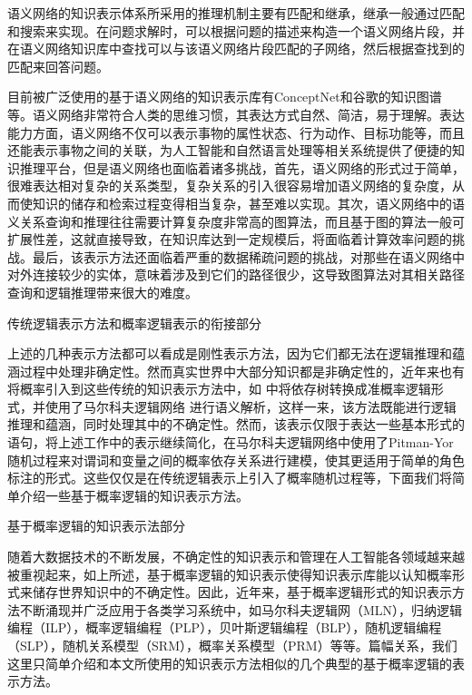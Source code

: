 语义网络的知识表示体系所采用的推理机制主要有匹配和继承，继承一般通过匹配和搜索来实现。在问题求解时，可以根据问题的描述来构造一个语义网络片段，并在语义网络知识库中查找可以与该语义网络片段匹配的子网络，然后根据查找到的匹配来回答问题。

目前被广泛使用的基于语义网络的知识表示库有ConceptNet\cite{Liu2004}和谷歌的知识图谱等。语义网络非常符合人类的思维习惯，其表达方式自然、简洁，易于理解。表达能力方面，语义网络不仅可以表示事物的属性状态、行为动作、目标功能等，而且还能表示事物之间的关联，为人工智能和自然语言处理等相关系统提供了便捷的知识推理平台，但是语义网络也面临着诸多挑战，首先，语义网络的形式过于简单，很难表达相对复杂的关系类型，复杂关系的引入很容易增加语义网络的复杂度，从而使知识的储存和检索过程变得相当复杂，甚至难以实现。其次，语义网络中的语义关系查询和推理往往需要计算复杂度非常高的图算法，而且基于图的算法一般可扩展性差，这就直接导致，在知识库达到一定规模后，将面临着计算效率问题的挑战。最后，该表示方法还面临着严重的数据稀疏问题的挑战，对那些在语义网络中对外连接较少的实体，意味着涉及到它们的路径很少，这导致图算法对其相关路径查询和逻辑推理带来很大的难度。



传统逻辑表示方法和概率逻辑表示的衔接部分

上述的几种表示方法都可以看成是刚性表示方法，因为它们都无法在逻辑推理和蕴涵过程中处理非确定性。然而真实世界中大部分知识都是非确定性的，近年来也有将概率引入到这些传统的知识表示方法中，如\cite{Poon2009} 中将依存树转换成准概率逻辑形式，并使用了马尔科夫逻辑网络 \cite{Domingos2007}进行语义解析，这样一来，该方法既能进行逻辑推理和蕴涵，同时处理其中的不确定性。然而，该表示仅限于表达一些基本形式的语句，\cite{Titov2011}将上述工作中的表示继续简化，在马尔科夫逻辑网络中使用了Pitman-Yor随机过程来对谓词和变量之间的概率依存关系进行建模，使其更适用于简单的角色标注的形式。这些仅仅是在传统逻辑表示上引入了概率随机过程等，下面我们将简单介绍一些基于概率逻辑的知识表示方法。




基于概率逻辑的知识表示法部分

      随着大数据技术的不断发展，不确定性的知识表示和管理在人工智能各领域越来越被重视起来，如上所述，基于概率逻辑的知识表示使得知识表示库能以认知概率形式来储存世界知识中的不确定性。因此，近年来，基于概率逻辑形式的知识表示方法不断涌现并广泛应用于各类学习系统中，如马尔科夫逻辑网（MLN），归纳逻辑编程（ILP），概率逻辑编程（PLP），贝叶斯逻辑编程（BLP），随机逻辑编程（SLP），随机关系模型（SRM），概率关系模型（PRM）等等。篇幅关系，我们这里只简单介绍和本文所使用的知识表示方法相似的几个典型的基于概率逻辑的表示方法。

